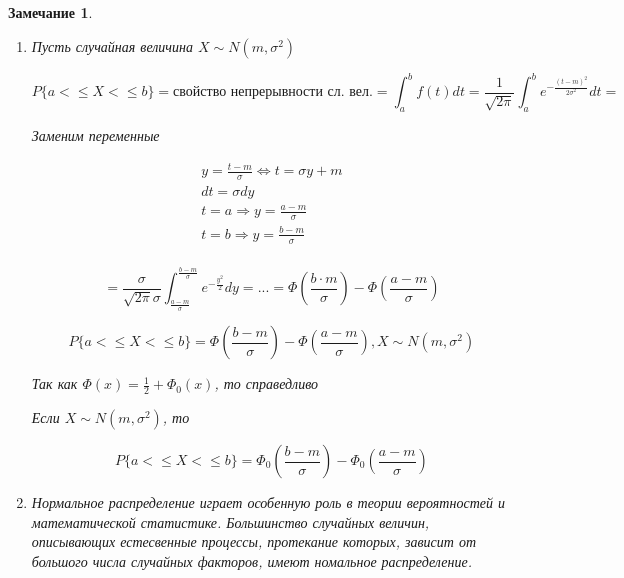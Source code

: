 \documentclass[a4paper, 14pt]{report}
\newtheorem{note}{Замечание}[section]
\begin{document}
\begin{note}
\begin{enumerate}
            Свойства функции $\Phi_0$:

            \begin{enumerate}
                \item $\Phi_0 = \frac{1}{2} + \Phi_0(x)$
                \item $\Phi_0(-x) = -\Phi_0(x)$ (нечетная функция)
                \item $\lim_{x\to -\infty} = -\frac{1}{2}$

                    $\lim_{x\to \infty} = \frac{1}{2}$

                \item $\Phi_0(0) = 0$
            \end{enumerate}

        \item Пусть случайная величина $X \sim N(m, \sigma^2)$

            $$
            P\{ a <\le X <\le b \} = \text{свойство непрерывности сл. вел.} = \int_a^bf(t)dt = \frac{1}{\sqrt{2\pi}} \int_a^b e^{-\frac{(t-m)^2}{2\sigma^2}} dt =
            $$

            Заменим переменные

            $$
            \begin{matrix}
                y = \frac{t-m}{\sigma} \Leftrightarrow t = \sigma y + m \\
                dt = \sigma dy \\
                t = a \Rightarrow y = \frac{a-m}{\sigma} \\
                t = b \Rightarrow y = \frac{b-m}{\sigma} \\
            \end{matrix}
            $$

            $$
            = \frac{\sigma}{\sqrt{2\pi}\sigma} \int_{\frac{a-m}{\sigma}}^{\frac{b-m}{\sigma}} e^{-\frac{y^2}{2}} dy = ... = \Phi(\frac{b \cdot m}{\sigma}) - \Phi(\frac{a-m}{\sigma})
            $$

            $$
            P\{a <\le X <\le b\} = \Phi(\frac{b-m}{\sigma}) - \Phi(\frac{a-m}{\sigma}), X \sim N(m, \sigma^2)
            $$

            Так как $\Phi(x) = \frac{1}{2} + \Phi_0(x)$, то справедливо

            Если $X \sim N(m, \sigma^2)$, то

            $$
            P\{ a <\le X <\le b \} = \Phi_0(\frac{b-m}{\sigma}) - \Phi_0(\frac{a-m}{\sigma})
            $$

        \item Нормальное распределение играет особенную роль в теории вероятностей и математической статистике. Большинство случайных величин, описывающих естесвенные процессы, протекание которых, зависит от большого числа случайных факторов, имеют номальное распределение.
    \end{enumerate}
\end{note}
\end{document}
